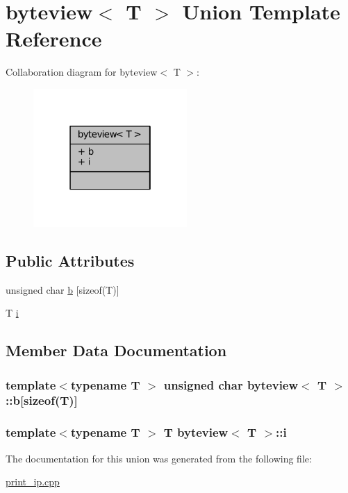 \hypertarget{unionbyteview}{}\section{byteview$<$ T $>$ Union Template Reference}
\label{unionbyteview}


Collaboration diagram for byteview$<$ T $>$\+:
\nopagebreak
\begin{figure}[H]
\begin{center}
\leavevmode
\includegraphics[width=166pt]{unionbyteview__coll__graph}
\end{center}
\end{figure}
\subsection*{Public Attributes}
\begin{DoxyCompactItemize}
\item 
unsigned char \hyperlink{unionbyteview_af86288b3e2724623c6a8836c07b26d28}{b} \mbox{[}sizeof(T)\mbox{]}
\item 
T \hyperlink{unionbyteview_a34c79afd8afd71191848bd8fa06fd286}{i}
\end{DoxyCompactItemize}


\subsection{Member Data Documentation}
\subsubsection[{\texorpdfstring{b}{b}}]{\setlength{\rightskip}{0pt plus 5cm}template$<$typename T $>$ unsigned char {\bf byteview}$<$ T $>$\+::b\mbox{[}sizeof(T)\mbox{]}}\hypertarget{unionbyteview_af86288b3e2724623c6a8836c07b26d28}{}\label{unionbyteview_af86288b3e2724623c6a8836c07b26d28}
\subsubsection[{\texorpdfstring{i}{i}}]{\setlength{\rightskip}{0pt plus 5cm}template$<$typename T $>$ T {\bf byteview}$<$ T $>$\+::i}\hypertarget{unionbyteview_a34c79afd8afd71191848bd8fa06fd286}{}\label{unionbyteview_a34c79afd8afd71191848bd8fa06fd286}


The documentation for this union was generated from the following file\+:\begin{DoxyCompactItemize}
\item 
\hyperlink{print__ip_8cpp}{print\+\_\+ip.\+cpp}\end{DoxyCompactItemize}
